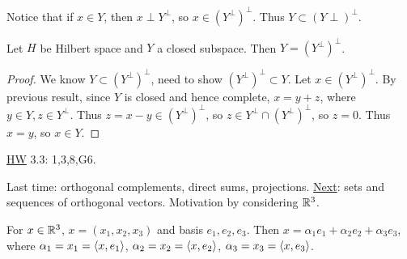 \documentclass[]{article}
\begin{document}
Notice that if $x\in Y$, then $x\perp Y^\perp$, so $x\in(Y^\perp)^\perp$. Thus $Y\subset(Y\perp)^\perp$.
\begin{lemma}
	Let $H$ be Hilbert space and $Y$ a closed subspace. Then $Y = (Y^\perp)^\perp$.
\end{lemma}
\begin{proof}
	We know $Y\subset (Y^\perp)^\perp$, need to show $(Y^\perp)^\perp\subset Y$.
	Let $x\in(Y^\perp)^\perp$. By previous result, since $Y$ is closed and hence complete, $x = y+z$, where $y\in Y,z\in Y^\perp$.
	Thus $z = x-y\in(Y^\perp)^\perp$, so $z\in Y^\perp\cap(Y^\perp)^\perp$, so $z=0$.
	Thus $x=y$, so $x\in Y$.
\end{proof}
\ul{HW} 3.3: 1,3,8,G6.

Last time: orthogonal complements, direct sums, projections.
\ul{Next}: sets and sequences of orthogonal vectors.
Motivation by considering $\mathbb{R}^3$.

For $x\in\mathbb{R}^3$, $x=(x_1,x_2,x_3)$ and basis $e_1,e_2,e_3$.
Then $x = \alpha_1e_1+\alpha_2e_2+\alpha_3e_3$, where $\alpha_1 = x_1 =\left\langle x,e_1 \right\rangle$, $\alpha_2=x_2=\left\langle x,e_2 \right\rangle$, $\alpha_3=x_3=\left\langle x,e_3 \right\rangle$.
\end{document}
